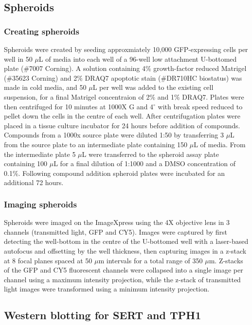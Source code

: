 \documentclass[a4paper,11pt,twoside,openright]{scrbook}
\begin{document}
\subsection{Spheroids}

\subsubsection{Creating spheroids}
Spheroids were created  by seeding approxmiately 10,000 GFP-expressing cells per well in 50 $\mu$L of media into each well of a 96-well low attachment U-bottomed plate (\#7007 Corning).
A solution containing 4\% growth-factor reduced Matrigel (\#35623 Corning) and 2\% DRAQ7 apoptotic stain (\#DR710HC biostatus) was made in cold media, and 50 $\mu$L per well was added to the existing cell suspension, for a final Matrigel concentraion of 2\% and 1\% DRAQ7.
Plates were then centrifuged for 10 minutes at 1000X G and 4$^\circ$ with break speed reduced to pellet down the cells in the centre of each well.
After centrifugation plates were placed in a tissue culture incubator for 24 hours before addition of compounds.
Compounds from a 1000x source plate were diluted 1:50 by transferring 3 $\mu$L from the source plate to an intermediate plate containing 150 $\mu$L of media.
From the intermediate plate 5 $\mu$L were transferred to the spheroid assay plate containing 100 $\mu$L for a final dilution of 1:1000 and a DMSO concentration of 0.1\%.
Following compound addition spheroid plates were incubated for an additional 72 hours.

\subsubsection{Imaging spheroids}
Spheroids were imaged on the ImageXpress using the 4X objective lens in 3 channels (transmitted light, GFP and CY5).
Images were captured by first detecting the well-bottom in the centre of the U-bottomed well with a laser-based autofocus and offsetting by the well thickness, then capturing images in a z-stack at 8 focal planes spaced at 50 $\mu$m intervals for a total range of 350 $\mu$m.
Z-stacks of the GFP and CY5 fluorescent channels were collapsed into a single image per channel using a maximum intensity projection, while the z-stack of transmitted light images were transformed using a minimum intensity projection.




\subsection{Western blotting for SERT and TPH1}
\end{document}
